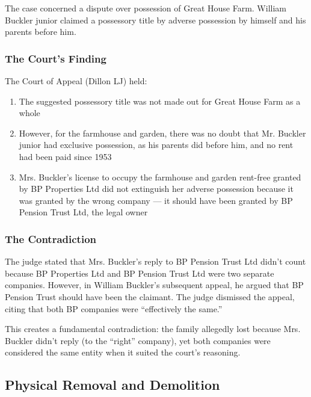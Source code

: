 \documentclass[11pt,a4paper]{article}
\begin{document}
The case concerned a dispute over possession of Great House Farm. William Buckler junior claimed a possessory title by adverse possession by himself and his parents before him.

\subsubsection{The Court's Finding}

The Court of Appeal (Dillon LJ) held:

\begin{enumerate}[label=\arabic*.]
    \item The suggested possessory title was not made out for Great House Farm as a whole
    \item However, for the farmhouse and garden, there was no doubt that Mr. Buckler junior had exclusive possession, as his parents did before him, and no rent had been paid since 1953
    \item Mrs. Buckler's license to occupy the farmhouse and garden rent-free granted by BP Properties Ltd did not extinguish her adverse possession because it was granted by the wrong company --- it should have been granted by BP Pension Trust Ltd, the legal owner
\end{enumerate}

\subsubsection{The Contradiction}

\begin{grievance}
The judge stated that Mrs. Buckler's reply to BP Pension Trust Ltd didn't count because BP Properties Ltd and BP Pension Trust Ltd were two separate companies. However, in William Buckler's subsequent appeal, he argued that BP Pension Trust should have been the claimant. The judge dismissed the appeal, citing that both BP companies were ``effectively the same.''

This creates a fundamental contradiction: the family allegedly lost because Mrs. Buckler didn't reply (to the ``right'' company), yet both companies were considered the same entity when it suited the court's reasoning.
\end{grievance}

\subsection{Physical Removal and Demolition}
\end{document}
